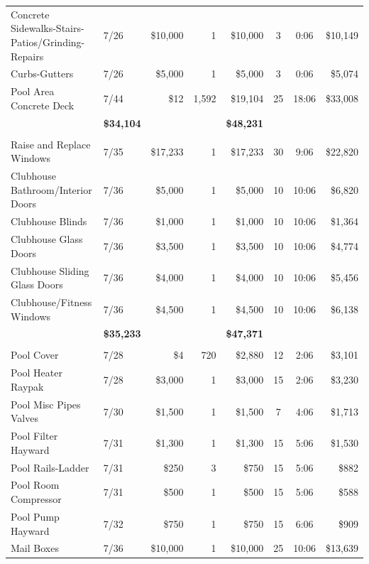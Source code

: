 \documentclass[11pt,letterpaper]{article}
\begin{document}
\begin{longtable}{p{4.2cm} p{1.6cm} r r r c c r}
Concrete Sidewalks-Stairs-Patios/Grinding-Repairs & 7/26 & \$10,000 & 1 & \$10,000 & 3 & 0:06 & \$10,149 \\
\rowcolor{blue!12} Curbs-Gutters & 7/26 & \$5,000 & 1 & \$5,000 & 3 & 0:06 & \$5,074 \\
Pool Area Concrete Deck & 7/44 & \$12 & 1,592 & \$19,104 & 25 & 18:06 & \$33,008 \\
\addlinespace[1pt] \multicolumn{4}{r}{} & \textbf{\$34,104} & & & \textbf{\$48,231} \\
\addlinespace[6pt]
\multicolumn{8}{l}{\textbf{Doors-Windows}} \\
\rowcolor{blue!12} Raise and Replace Windows & 7/35 & \$17,233 & 1 & \$17,233 & 30 & 9:06 & \$22,820 \\
Clubhouse Bathroom/Interior Doors & 7/36 & \$5,000 & 1 & \$5,000 & 10 & 10:06 & \$6,820 \\
\rowcolor{blue!12} Clubhouse Blinds & 7/36 & \$1,000 & 1 & \$1,000 & 10 & 10:06 & \$1,364 \\
Clubhouse Glass Doors & 7/36 & \$3,500 & 1 & \$3,500 & 10 & 10:06 & \$4,774 \\
\rowcolor{blue!12} Clubhouse Sliding Glass Doors & 7/36 & \$4,000 & 1 & \$4,000 & 10 & 10:06 & \$5,456 \\
Clubhouse/Fitness Windows & 7/36 & \$4,500 & 1 & \$4,500 & 10 & 10:06 & \$6,138 \\
\addlinespace[1pt] \multicolumn{4}{r}{} & \textbf{\$35,233} & & & \textbf{\$47,371} \\
\addlinespace[6pt]
\multicolumn{8}{l}{\textbf{Equipment}} \\
\rowcolor{blue!12} Pool Cover & 7/28 & \$4 & 720 & \$2,880 & 12 & 2:06 & \$3,101 \\
Pool Heater Raypak & 7/28 & \$3,000 & 1 & \$3,000 & 15 & 2:06 & \$3,230 \\
\rowcolor{blue!12} Pool Misc Pipes Valves & 7/30 & \$1,500 & 1 & \$1,500 & 7 & 4:06 & \$1,713 \\
Pool Filter Hayward & 7/31 & \$1,300 & 1 & \$1,300 & 15 & 5:06 & \$1,530 \\
\rowcolor{blue!12} Pool Rails-Ladder & 7/31 & \$250 & 3 & \$750 & 15 & 5:06 & \$882 \\
Pool Room Compressor & 7/31 & \$500 & 1 & \$500 & 15 & 5:06 & \$588 \\
\rowcolor{blue!12} Pool Pump Hayward & 7/32 & \$750 & 1 & \$750 & 15 & 6:06 & \$909 \\
Mail Boxes & 7/36 & \$10,000 & 1 & \$10,000 & 25 & 10:06 & \$13,639 \\

\end{longtable}
\end{document}
